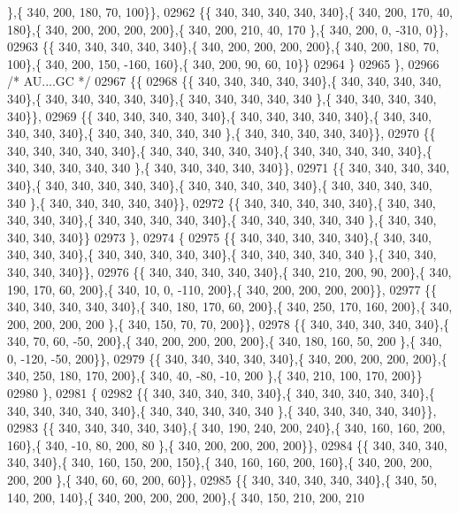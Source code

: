 \begin{DoxyCode}
      \},\{ 340, 200, 180,  70, 100\}\},
02962 \{\{ 340, 340, 340, 340, 340\},\{ 340, 200, 170,  40, 180\},\{ 340, 200, 200, 200, 200\},\{ 340, 200, 210,  40, 170
      \},\{ 340, 200,   0, -310,   0\}\},
02963 \{\{ 340, 340, 340, 340, 340\},\{ 340, 200, 200, 200, 200\},\{ 340, 200, 180,  70, 100\},\{ 340, 200, 150, -160, 
      160\},\{ 340, 200,  90,  60,  10\}\}
02964 \}
02965 \},
02966 \textcolor{comment}{/* AU....GC */}
02967 \{\{
02968 \{\{ 340, 340, 340, 340, 340\},\{ 340, 340, 340, 340, 340\},\{ 340, 340, 340, 340, 340\},\{ 340, 340, 340, 340, 340
      \},\{ 340, 340, 340, 340, 340\}\},
02969 \{\{ 340, 340, 340, 340, 340\},\{ 340, 340, 340, 340, 340\},\{ 340, 340, 340, 340, 340\},\{ 340, 340, 340, 340, 340
      \},\{ 340, 340, 340, 340, 340\}\},
02970 \{\{ 340, 340, 340, 340, 340\},\{ 340, 340, 340, 340, 340\},\{ 340, 340, 340, 340, 340\},\{ 340, 340, 340, 340, 340
      \},\{ 340, 340, 340, 340, 340\}\},
02971 \{\{ 340, 340, 340, 340, 340\},\{ 340, 340, 340, 340, 340\},\{ 340, 340, 340, 340, 340\},\{ 340, 340, 340, 340, 340
      \},\{ 340, 340, 340, 340, 340\}\},
02972 \{\{ 340, 340, 340, 340, 340\},\{ 340, 340, 340, 340, 340\},\{ 340, 340, 340, 340, 340\},\{ 340, 340, 340, 340, 340
      \},\{ 340, 340, 340, 340, 340\}\}
02973 \},
02974 \{
02975 \{\{ 340, 340, 340, 340, 340\},\{ 340, 340, 340, 340, 340\},\{ 340, 340, 340, 340, 340\},\{ 340, 340, 340, 340, 340
      \},\{ 340, 340, 340, 340, 340\}\},
02976 \{\{ 340, 340, 340, 340, 340\},\{ 340, 210, 200,  90, 200\},\{ 340, 190, 170,  60, 200\},\{ 340,  10,   0, -110, 
      200\},\{ 340, 200, 200, 200, 200\}\},
02977 \{\{ 340, 340, 340, 340, 340\},\{ 340, 180, 170,  60, 200\},\{ 340, 250, 170, 160, 200\},\{ 340, 200, 200, 200, 200
      \},\{ 340, 150,  70,  70, 200\}\},
02978 \{\{ 340, 340, 340, 340, 340\},\{ 340,  70,  60, -50, 200\},\{ 340, 200, 200, 200, 200\},\{ 340, 180, 160,  50, 200
      \},\{ 340,   0, -120, -50, 200\}\},
02979 \{\{ 340, 340, 340, 340, 340\},\{ 340, 200, 200, 200, 200\},\{ 340, 250, 180, 170, 200\},\{ 340,  40, -80, -10, 200
      \},\{ 340, 210, 100, 170, 200\}\}
02980 \},
02981 \{
02982 \{\{ 340, 340, 340, 340, 340\},\{ 340, 340, 340, 340, 340\},\{ 340, 340, 340, 340, 340\},\{ 340, 340, 340, 340, 340
      \},\{ 340, 340, 340, 340, 340\}\},
02983 \{\{ 340, 340, 340, 340, 340\},\{ 340, 190, 240, 200, 240\},\{ 340, 160, 160, 200, 160\},\{ 340, -10,  80, 200,  80
      \},\{ 340, 200, 200, 200, 200\}\},
02984 \{\{ 340, 340, 340, 340, 340\},\{ 340, 160, 150, 200, 150\},\{ 340, 160, 160, 200, 160\},\{ 340, 200, 200, 200, 200
      \},\{ 340,  60,  60, 200,  60\}\},
02985 \{\{ 340, 340, 340, 340, 340\},\{ 340,  50, 140, 200, 140\},\{ 340, 200, 200, 200, 200\},\{ 340, 150, 210, 200, 210

\end{DoxyCode}
